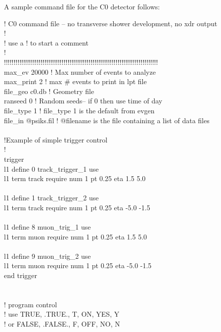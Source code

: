A sample command file for the C0 detector follows:



! C0 command file -- no transverse shower development, no xdr output\\
!\\
! use a ! to start a comment\\
!\\
!!!!!!!!!!!!!!!!!!!!!!!!!!!!!!!!!!!!!!!!!!!!!!!!!!!!!!!!!!!!!!!!!!!!!!!!!!!!!!!!\\
max\_ev 20000           ! Max number of events to analyze\\
max\_print 2            ! max \# events to print in lpt file\\
file\_geo c0.db         ! Geometry file\\
ranseed  0              ! Random seeds-- if 0 then use time of day\\
file\_type 1            ! file\_type 1 is the default from evgen\\
file\_in @psiks.fil     ! @filename is the file containing a list of data files\\
\\
!Example of simple trigger control\\
!\\
trigger\\
l1 define 0 track\_trigger\_1 use\\
l1 term track require num 1 pt 0.25 eta 1.5 5.0\\
\\
l1 define 1 track\_trigger\_2 use\\
l1 term track require num 1 pt 0.25 eta -5.0 -1.5\\
\\
l1 define 8 muon\_trig\_1 use\\
l1 term muon require num 1 pt 0.25 eta 1.5 5.0\\
\\
l1 define 9 muon\_trig\_2 use\\
l1 term muon require num 1 pt 0.25 eta -5.0 -1.5\\
end trigger\\
\\
\\
! program control   \\  
! use TRUE,  .TRUE.,  T, ON,  YES, Y\\
! or  FALSE, .FALSE., F, OFF, NO,  N\\

